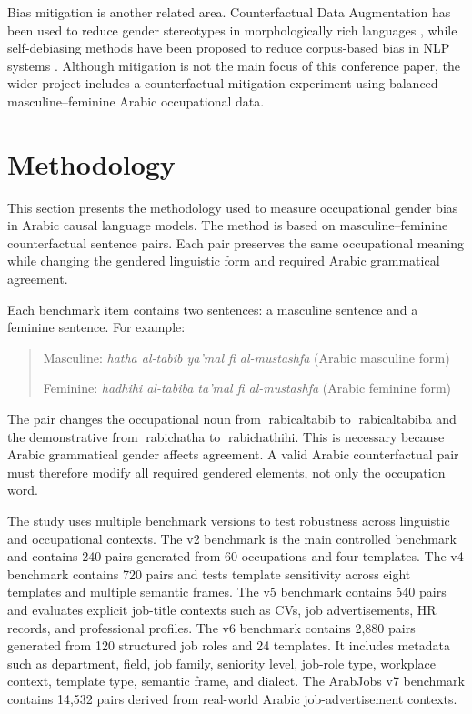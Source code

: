 \documentclass[conference]{IEEEtran}
\begin{document}
Bias mitigation is another related area. Counterfactual Data Augmentation has been used to reduce gender stereotypes in morphologically rich languages \cite{zmigrod2019}, while self-debiasing methods have been proposed to reduce corpus-based bias in NLP systems \cite{schick2021}. Although mitigation is not the main focus of this conference paper, the wider project includes a counterfactual mitigation experiment using balanced masculine--feminine Arabic occupational data.

\section{Methodology}

This section presents the methodology used to measure occupational gender bias in Arabic causal language models. The method is based on masculine--feminine counterfactual sentence pairs. Each pair preserves the same occupational meaning while changing the gendered linguistic form and required Arabic grammatical agreement.

Each benchmark item contains two sentences: a masculine sentence and a feminine sentence. For example:

\begin{quote}
Masculine: \textit{hatha al-tabib ya'mal fi al-mustashfa} (Arabic masculine form)

Feminine: \textit{hadhihi al-tabiba ta'mal fi al-mustashfa} (Arabic feminine form)
\end{quote}

The pair changes the occupational noun from rabicaltabib{} to rabicaltabiba{} and the demonstrative from rabichatha{} to rabichathihi{}. This is necessary because Arabic grammatical gender affects agreement. A valid Arabic counterfactual pair must therefore modify all required gendered elements, not only the occupation word.

The study uses multiple benchmark versions to test robustness across linguistic and occupational contexts. The v2 benchmark is the main controlled benchmark and contains 240 pairs generated from 60 occupations and four templates. The v4 benchmark contains 720 pairs and tests template sensitivity across eight templates and multiple semantic frames. The v5 benchmark contains 540 pairs and evaluates explicit job-title contexts such as CVs, job advertisements, HR records, and professional profiles. The v6 benchmark contains 2,880 pairs generated from 120 structured job roles and 24 templates. It includes metadata such as department, field, job family, seniority level, job-role type, workplace context, template type, semantic frame, and dialect. The ArabJobs v7 benchmark contains 14,532 pairs derived from real-world Arabic job-advertisement contexts.
\end{document}
